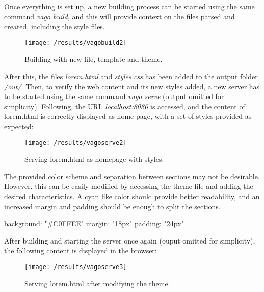 Once everything is set up, a new building process can be started using the same command \emph{vago build}, and this
will provide context on the files parsed and created, including the style files.

\begin{figure}
\centering
\texttt{[image: /results/vagobuild2]}
\caption{Building with new file, template and theme.}
\label{fig:build2}
\end{figure}

After this, the files \emph{lorem.html} and \emph{styles.css} has been added to the output folder \emph{/out/}.
Then, to verify the web content and its new styles added, a new server has to be started using the same command
\emph{vago serve} (output omitted for simplicity).
Following, the URL \emph{localhost:8080} is accessed, and the content of lorem.html is correctly displayed as home
page, with a set of styles provided as expected:

\begin{figure}
\centering
\texttt{[image: /results/vagoserve2]}
\caption{Serving lorem.html as homepage with styles.}
\label{fig:serve2}
\end{figure}

The provided color scheme and separation between sections may not be desirable. However, this can be easily modified
by accessing the theme file and adding the desired characteristics. A cyan like color should provide better
readability, and an increased margin and padding should be enough to split the sections.

\begin{code}
background: "#C0FFEE"
margin: "18px"
padding: "24px"
\end{code}

After building and starting the server once again (ouput omitted for simplicity), the following content is displayed in
the browser:

\begin{figure}
\centering
\texttt{[image: /results/vagoserve3]}
\caption{Serving lorem.html after modifying the theme.}
\label{fig:serve3}
\end{figure}